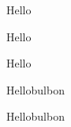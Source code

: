 \lipsum[1]

\begin{tblslineshorizontal}{Hello}
\lipsum[2]
\end{tblslineshorizontal}

\begin{tblsfilled}{Hello}
\lipsum[2]
\end{tblsfilled}

\begin{tblsframed}{Hello}
\lipsum[2]
\end{tblsframed}


\begin{tblsfilledsymbol}{Hello}{bulbon}
\lipsum[24-30]
\end{tblsfilledsymbol}

\begin{tblsframedsymbol}{Hello}{bulbon}
\lipsum[24-30]
\end{tblsframedsymbol}

% 
% 
% 
% 
% 
% 
% 
% 

